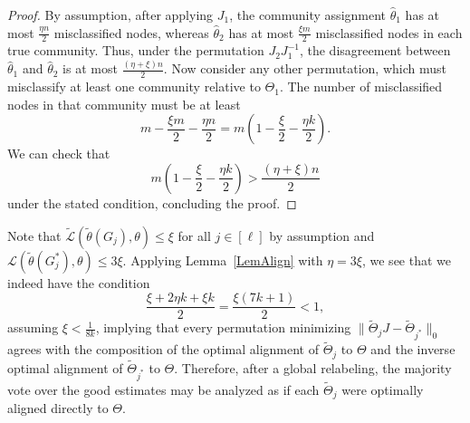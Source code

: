 \documentclass{article}
\newcommand{\thetahat}{\ensuremath{\widehat{\theta}}}
\begin{document}
\begin{proof}
By assumption, after applying $J_1$, the community assignment $\thetahat_1$ has at most $\frac{\eta n}{2}$ misclassified nodes, whereas $\thetahat_2$ has at most $\frac{\xi m}{2}$ misclassified nodes in each true community. Thus, under the permutation $J_2 J_1^{-1}$, the disagreement between $\thetahat_1$ and $\thetahat_2$ is at most $\frac{(\eta + \xi)n}{2}$. Now consider any other permutation, which must misclassify at least one community relative to $\Theta_1$. The number of misclassified nodes in that community must be at least
\begin{equation*}
m - \frac{\xi m}{2} - \frac{\eta n}{2} = m\left(1 - \frac{\xi}{2} - \frac{\eta k}{2}\right).
\end{equation*}
We can check that
\begin{equation*}
m\left(1 - \frac{\xi}{2} - \frac{\eta k}{2}\right) > \frac{(\eta + \xi)n}{2}
\end{equation*}
under the stated condition, concluding the proof.
\end{proof}

Note that $\widetilde{\mathcal{L}}(\widetilde{\theta}(G_j), \theta) \le \xi$ for all $j \in [\ell]$ by assumption and $\mathcal{L}(\widetilde{\theta}(G_j^*), \theta) \le 3 \xi$. Applying Lemma~\ref{LemAlign} with $\eta = 3\xi$, we see that we indeed have the condition
\begin{equation*}
\frac{\xi + 2\eta k + \xi k}{2} = \frac{\xi(7k + 1)}{2} < 1,
\end{equation*}
assuming $\xi < \frac{1}{8k}$, implying that every permutation minimizing $\|\widetilde{\Theta}_j J - \widetilde{\Theta}_{j^*}\|_0$ agrees with the composition of the optimal alignment of $\widetilde{\Theta}_j$ to $\Theta$ and the inverse optimal alignment of $\widetilde{\Theta}_{j^*}$ to $\Theta$. Therefore, after a global relabeling, the majority vote over the good estimates may be analyzed as if each $\widetilde{\Theta}_j$ were optimally aligned directly to $\Theta$.

\end{document}
